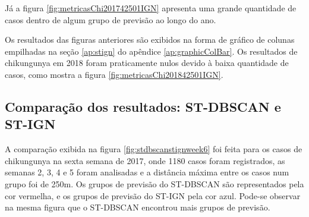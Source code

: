 Já a figura \ref{fig:metricasChi201742501IGN} apresenta uma grande quantidade de casos dentro de algum grupo de previsão ao longo do ano.
\begin{figure}[!ht]
	\centering	
\end{figure}
\FloatBarrier

Os resultados das figuras anteriores são exibidos na forma de gráfico de colunas empilhadas na seção \ref{ap:stign} do apêndice \ref{ap:graphicColBar}. 
Os resultados de chikungunya em 2018 foram praticamente nulos devido à baixa quantidade de casos, como mostra a figura \ref{fig:metricasChi201842501IGN}.



\subsection{Comparação dos resultados: ST-DBSCAN e ST-IGN}

A comparação exibida na figura \ref{fig:stdbscanstignweek6} foi feita para os casos de chikungunya na sexta semana de 2017, onde 1180 casos foram registrados, as semanas 2, 3, 4 e 5 foram analisadas e a distância máxima entre os casos num grupo foi de 250m. Os grupos de previsão do \acrshort{ST-DBSCAN} são representados pela cor vermelha, e os grupos de previsão do ST-IGN pela cor azul.
Pode-se observar na mesma figura que o \acrshort{ST-DBSCAN} encontrou mais grupos de previsão.

